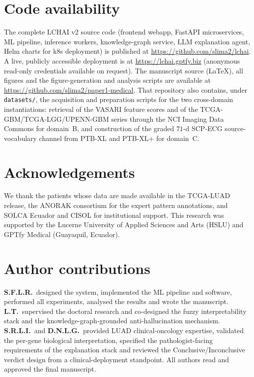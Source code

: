 \section*{Code availability}
The complete LCHAI v2 source code (frontend webapp, FastAPI
microservices, ML pipeline, inference workers, knowledge-graph
service, LLM explanation agent, Helm charts for k8s deployment)
is published at
\url{https://github.com/slima2/lchai}.
A live, publicly accessible deployment is at
\url{https://lchai.gptfy.biz} (anonymous read-only credentials
available on request).
The manuscript source (LaTeX), all figures and the figure-generation
and analysis scripts are available at
\url{https://github.com/slima2/paper1-medical}.
That repository also contains, under \texttt{datasets/}, the
acquisition and preparation scripts for the two
cross-domain instantiations: retrieval of the VASARI feature scores
and of the TCGA-GBM/TCGA-LGG/UPENN-GBM series through the NCI Imaging
Data Commons for domain~B, and construction of the graded $71$-d
SCP-ECG source-vocabulary channel from PTB-XL and PTB-XL$+$ for
domain~C.

\section*{Acknowledgements}
We thank the patients whose data are made available in the TCGA-LUAD
release, the ANORAK consortium for the expert pattern annotations,
and SOLCA Ecuador and CISOL for institutional support.
This research was supported by the Lucerne University of Applied
Sciences and Arts (HSLU) and GPTfy Medical (Guayaquil, Ecuador).

\section*{Author contributions}
\textbf{S.F.L.R.}\ designed the system, implemented the ML pipeline
and \lchai{} software, performed all experiments, analysed the
results and wrote the manuscript.
\textbf{L.T.}\ supervised the doctoral research and co-designed the
fuzzy interpretability stack and the knowledge-graph-grounded
anti-hallucination mechanism.
\textbf{S.R.L.I.}\ and \textbf{D.N.L.G.}\ provided LUAD
clinical-oncology expertise, validated the per-gene biological
interpretation, specified the pathologist-facing requirements of the
explanation stack and reviewed the Conclusive/Inconclusive verdict
design from a clinical-deployment standpoint.
All authors read and approved the final manuscript.

